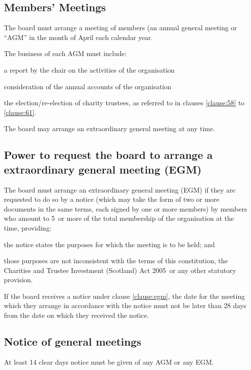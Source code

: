 \documentclass{article}
\newcommand{\charityact}{Charities and Trustee Investment (Scotland) Act 2005}
\begin{document}
\subsection{Members' Meetings}

\clause The board must arrange a meeting of members (an annual general
meeting or ``AGM'' in the month of April each calendar year.

\clause The business of each AGM must include:

\subclause a report by the chair on the activities of the organisation

\subclause consideration of the annual accounts of the organisation

\subclause the election/re-election of charity trustees, as referred
to in clauses \ref{clause:58} to \ref{clause:61}.

\clause The board may arrange an extraordinary general meeting at any time.

\subsection{Power to request the board to arrange a extraordinary
  general meeting (EGM)}

\clause\label{clause:egm}The board must arrange an extraordinary
general meeting (EGM) if they are requested to do so by a notice
(which may take the form of two or more documents in the same terms,
each signed by one or more members) by members who amount to
5\percent\ or more of the total membership of the organisation at the
time, providing:

\subclause the notice states the purposes for which the meeting is to
be held; and

\subclause those purposes are not inconsistent with the terms of this
constitution, the \charityact\ or any
other statutory provision.

\clause If the board receives a notice under clause \ref{clause:egm},
the date for the meeting which they arrange in accordance with the
notice must not be later than 28 days from the date on which they
received the notice.

\subsection{Notice of general meetings}

\clause\label{clause:meeting_notice}At least 14 clear days notice must
be given of any AGM or any EGM.
\end{document}
